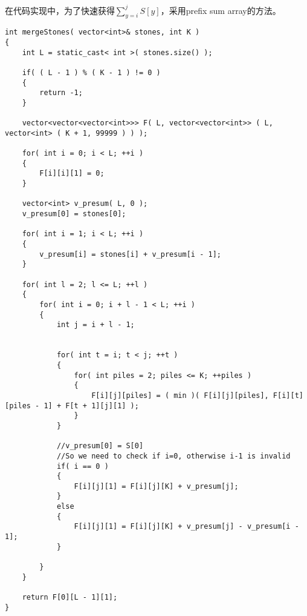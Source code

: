 在代码实现中，为了快速获得$\sum\limits_{y=i}^{j}S[y]$，采用prefix sum array的方法。
\setcounter{lstlisting}{0}
\begin{lstlisting}[style=customc, caption={Dynamic Programming}]
int mergeStones( vector<int>& stones, int K )
{
    int L = static_cast< int >( stones.size() );

    if( ( L - 1 ) % ( K - 1 ) != 0 )
    {
        return -1;
    }

    vector<vector<vector<int>>> F( L, vector<vector<int>> ( L, vector<int> ( K + 1, 99999 ) ) );

    for( int i = 0; i < L; ++i )
    {
        F[i][i][1] = 0;
    }

    vector<int> v_presum( L, 0 );
    v_presum[0] = stones[0];

    for( int i = 1; i < L; ++i )
    {
        v_presum[i] = stones[i] + v_presum[i - 1];
    }

    for( int l = 2; l <= L; ++l )
    {
        for( int i = 0; i + l - 1 < L; ++i )
        {
            int j = i + l - 1;


            for( int t = i; t < j; ++t )
            {
                for( int piles = 2; piles <= K; ++piles )
                {
                    F[i][j][piles] = ( min )( F[i][j][piles], F[i][t][piles - 1] + F[t + 1][j][1] );
                }
            }

            //v_presum[0] = S[0]
            //So we need to check if i=0, otherwise i-1 is invalid
            if( i == 0 )
            {
                F[i][j][1] = F[i][j][K] + v_presum[j];
            }
            else
            {
                F[i][j][1] = F[i][j][K] + v_presum[j] - v_presum[i - 1];
            }

        }
    }

    return F[0][L - 1][1];
}
\end{lstlisting}